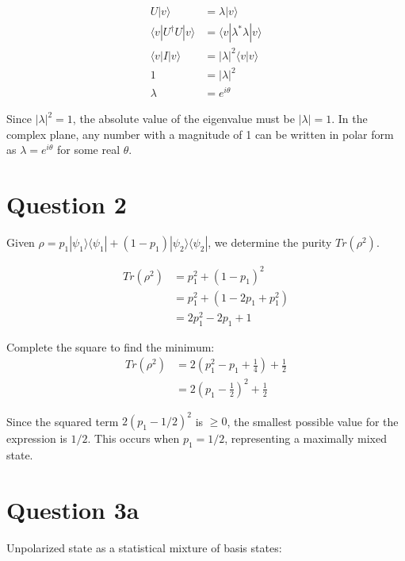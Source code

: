 \documentclass{article}
\begin{document}
\begin{align*}
U|v\rangle &= \lambda |v\rangle \\
\langle v| U^\dagger U |v\rangle &= \langle v | \lambda^* \lambda |v\rangle \\
\langle v | I | v \rangle &= |\lambda|^2 \langle v | v \rangle \\
1 &= |\lambda|^2 \\
\lambda &= e^{i\theta}
\end{align*}

Since $|\lambda|^2 = 1$, the absolute value of the eigenvalue must be $|\lambda| = 1$. In the complex plane, any number with a magnitude of 1 can be written in polar form as $\lambda = e^{i\theta}$ for some real $\theta$. \\

\newpage
\section*{Question 2}

Given $\rho = p_1 |\psi_1\rangle\langle\psi_1| + (1-p_1) |\psi_2\rangle\langle\psi_2|$, we determine the purity $Tr(\rho^2)$.

\begin{align*}
Tr(\rho^2) &= p_1^2 + (1-p_1)^2 \\
&= p_1^2 + (1 - 2p_1 + p_1^2) \\
&= 2p_1^2 - 2p_1 + 1
\end{align*}

Complete the square to find the minimum:
\begin{align*}
Tr(\rho^2) &= 2\left(p_1^2 - p_1 + \frac{1}{4}\right) + \frac{1}{2} \\
&= 2\left(p_1 - \frac{1}{2}\right)^2 + \frac{1}{2}
\end{align*}

Since the squared term $2(p_1 - 1/2)^2$ is $\geq 0$, the smallest possible value for the expression is $1/2$. This occurs when $p_1 = 1/2$, representing a maximally mixed state.
\newpage
\section*{Question 3a}

Unpolarized state as a statistical mixture of basis states:
\end{document}
